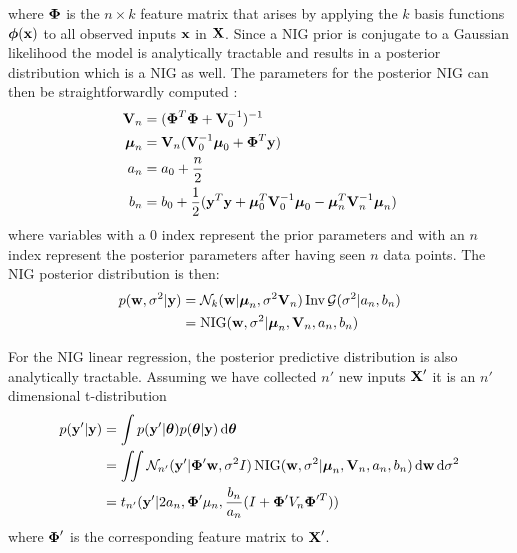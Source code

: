 \documentclass[../thesis.tex]{subfiles}
\begin{document}
where $\boldsymbol{\mathbf{\Phi}}$ is the $n \times k$ feature matrix that arises by applying the $k$ basis functions $\boldsymbol{\mathbf{\phi}}(\boldsymbol{\mathbf{x}})$ to all observed inputs $\boldsymbol{\mathbf{x}}$ in $\boldsymbol{\mathbf{X}}$. Since a NIG prior is conjugate to a Gaussian likelihood the model is analytically tractable and results in a posterior distribution which is a NIG as well. The parameters for the posterior NIG can then be straightforwardly computed \parencite[Chapter~14.2]{gelman2014bayesian} \parencite{murphy2007conjugate}:
\begin{equation}
    \begin{split}
        \boldsymbol{\mathbf{V}}_n &= (\boldsymbol{\mathbf{\Phi}}^T \boldsymbol{\mathbf{\Phi}} + \boldsymbol{\mathbf{V}}_0^{-1})^{-1} \\
        \boldsymbol{\mathbf{\mu}}_n &= \boldsymbol{\mathbf{V}}_n (\boldsymbol{\mathbf{V}}_0^{-1} \boldsymbol{\mathbf{\mu}}_0 + \boldsymbol{\mathbf{\Phi}}^T \boldsymbol{\mathbf{y}}) \\
        a_n &= a_0 + \frac{n}{2} \\
        b_n &= b_0 + \frac{1}{2} (\boldsymbol{\mathbf{y}}^T \boldsymbol{\mathbf{y}} + \boldsymbol{\mathbf{\mu}}_0^T \boldsymbol{\mathbf{V}}_0^{-1}\boldsymbol{\mathbf{\mu}}_0 - \boldsymbol{\mathbf{\mu}}_n^T \boldsymbol{\mathbf{V}}_n^{-1} \boldsymbol{\mathbf{\mu}}_n)
    \end{split}
\end{equation}
where variables with a $0$ index represent the prior parameters and with an $n$ index represent the posterior parameters after having seen $n$ data points. The NIG posterior distribution is then:
\begin{equation}
    \begin{split}
    p(\boldsymbol{\mathbf{w}}, \sigma^2 | \boldsymbol{\mathbf{y}}) &= \mathcal{N}_k(\boldsymbol{\mathbf{w}} | \boldsymbol{\mathbf{\mu}}_n, \sigma^2 \boldsymbol{\mathbf{V}}_n) \operatorname{Inv}\mathcal{G}(\sigma^2 | a_n, b_n)  \\  
    &= \operatorname{NIG}(\boldsymbol{\mathbf{w}}, \sigma^2 | \boldsymbol{\mathbf{\mu}}_n, \boldsymbol{\mathbf{V}}_n, a_n, b_n)
    \end{split}
\end{equation}

For the NIG linear regression, the posterior predictive distribution is also analytically tractable. Assuming we have collected $n'$ new inputs $\boldsymbol{\mathbf{X}}'$ it is an $n'$ dimensional t-distribution
\begin{equation}
    \begin{split}
        p(\boldsymbol{\mathbf{y}}' | \boldsymbol{\mathbf{y}}) &= \int p(\boldsymbol{\mathbf{y}}' | \boldsymbol{\mathbf{\theta}}) p(\boldsymbol{\mathbf{\theta}} | \boldsymbol{\mathbf{y}}) \mathop{}\!\mathrm{d}\boldsymbol{\mathbf{\theta}} \\
        &=  \iint \mathcal{N}_{n'} (\boldsymbol{\mathbf{y}}' | \boldsymbol{\mathbf{\Phi}}' \boldsymbol{\mathbf{w}}, \sigma^2 I)  \operatorname{NIG}(\boldsymbol{\mathbf{w}}, \sigma^2 | \boldsymbol{\mathbf{\mu}}_n, \boldsymbol{\mathbf{V}}_n, a_n, b_n) \mathop{}\!\mathrm{d} \boldsymbol{\mathbf{w}} \mathop{}\!\mathrm{d}\sigma^2 \\
        &=  t_{n'}(\boldsymbol{\mathbf{y}}' | 2a_n, \boldsymbol{\mathbf{\Phi}}' \mu_n, \frac{b_n}{a_n} (I + \boldsymbol{\mathbf{\Phi}}' V_n \boldsymbol{\mathbf{\Phi}}^{\prime T}))
    \end{split}
\end{equation}
where $\boldsymbol{\mathbf{\Phi}}'$ is the corresponding feature matrix to $\boldsymbol{\mathbf{X}}'$. 
\end{document}
